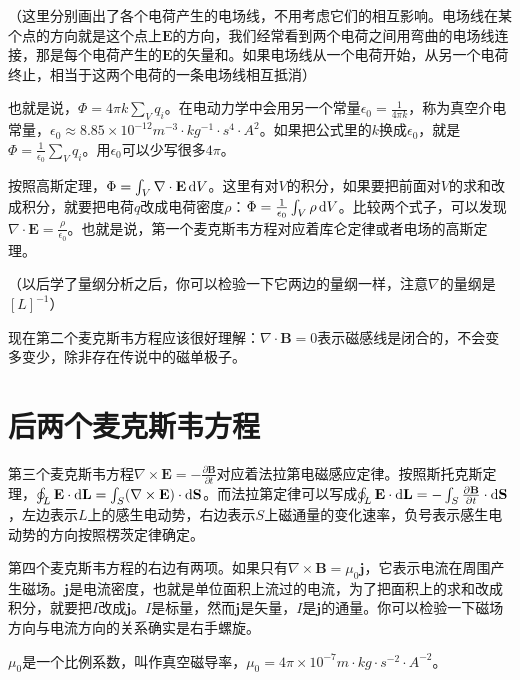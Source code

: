 （这里分别画出了各个电荷产生的电场线，不用考虑它们的相互影响。电场线在某个点的方向就是这个点上$\mathbf{E}$的方向，我们经常看到两个电荷之间用弯曲的电场线连接，那是每个电荷产生的$\mathbf{E}$的矢量和。如果电场线从一个电荷开始，从另一个电荷终止，相当于这两个电荷的一条电场线相互抵消）

也就是说，$\Phi=4 \pi k \sum_V q_i$。在电动力学中会用另一个常量$\epsilon_0=\frac{1}{4 \pi k}$，称为真空介电常量，$\epsilon_0 \approx 8.85 \times 10^{-12} \unit{m^{-3} \cdot kg^{-1} \cdot s^4 \cdot A^2}$。如果把公式里的$k$换成$\epsilon_0$，就是$\Phi=\frac{1}{\epsilon_0} \sum_V q_i$。用$\epsilon_0$可以少写很多$4 \pi$。

按照高斯定理，$\Phi=\int_V \nabla \cdot \mathbf{E} \mathop{}\!\mathrm{d} V$。这里有对$V$的积分，如果要把前面对$V$的求和改成积分，就要把电荷$q$改成电荷密度$\rho$：$\Phi=\frac{1}{\epsilon_0} \int_V \rho \mathop{}\!\mathrm{d} V$。比较两个式子，可以发现$\nabla \cdot \mathbf{E}=\frac{\rho}{\epsilon_0}$。也就是说，第一个麦克斯韦方程对应着库仑定律或者电场的高斯定理。

（以后学了量纲分析之后，你可以检验一下它两边的量纲一样，注意$\nabla$的量纲是$[L]^{-1}$）

现在第二个麦克斯韦方程应该很好理解：$\nabla \cdot \mathbf{B}=0$表示磁感线是闭合的，不会变多变少，除非存在传说中的磁单极子。
\section{后两个麦克斯韦方程}
第三个麦克斯韦方程$\nabla \times \mathbf{E}=-\frac{\partial \mathbf{B}}{\partial t}$对应着法拉第电磁感应定律。按照斯托克斯定理，$\oint_L \mathbf{E} \cdot \mathop{}\!\mathrm{d} \mathbf{L}=\int_S (\nabla \times \mathbf{E}) \cdot \mathop{}\!\mathrm{d} \mathbf{S}$。而法拉第定律可以写成$\oint_L \mathbf{E} \cdot \mathop{}\!\mathrm{d} \mathbf{L}=-\int_S \frac{\partial \mathbf{B}}{\partial t} \cdot \mathop{}\!\mathrm{d} \mathbf{S}$，左边表示$L$上的感生电动势，右边表示$S$上磁通量的变化速率，负号表示感生电动势的方向按照楞茨定律确定。

第四个麦克斯韦方程的右边有两项。如果只有$\nabla \times \mathbf{B}=\mu_0 \mathbf{j}$，它表示电流在周围产生磁场。$\mathbf{j}$是电流密度，也就是单位面积上流过的电流，为了把面积上的求和改成积分，就要把$I$改成$\mathbf{j}$。$I$是标量，然而$\mathbf{j}$是矢量，$I$是$\mathbf{j}$的通量。你可以检验一下磁场方向与电流方向的关系确实是右手螺旋。

$\mu_0$是一个比例系数，叫作真空磁导率，$\mu_0=4 \pi \times 10^{-7} \unit{m \cdot kg \cdot s^{-2} \cdot A^{-2}}$。

